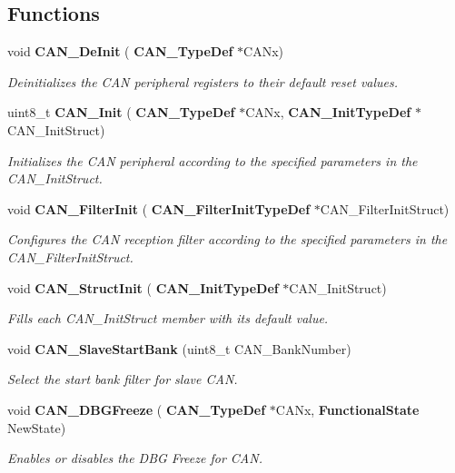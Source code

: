 \subsection*{Functions}
\begin{DoxyCompactItemize}
\item 
void \textbf{ C\+A\+N\+\_\+\+De\+Init} (\textbf{ C\+A\+N\+\_\+\+Type\+Def} $\ast$C\+A\+Nx)
\begin{DoxyCompactList}\small\item\em Deinitializes the C\+AN peripheral registers to their default reset values. \end{DoxyCompactList}\item 
uint8\+\_\+t \textbf{ C\+A\+N\+\_\+\+Init} (\textbf{ C\+A\+N\+\_\+\+Type\+Def} $\ast$C\+A\+Nx, \textbf{ C\+A\+N\+\_\+\+Init\+Type\+Def} $\ast$C\+A\+N\+\_\+\+Init\+Struct)
\begin{DoxyCompactList}\small\item\em Initializes the C\+AN peripheral according to the specified parameters in the C\+A\+N\+\_\+\+Init\+Struct. \end{DoxyCompactList}\item 
void \textbf{ C\+A\+N\+\_\+\+Filter\+Init} (\textbf{ C\+A\+N\+\_\+\+Filter\+Init\+Type\+Def} $\ast$C\+A\+N\+\_\+\+Filter\+Init\+Struct)
\begin{DoxyCompactList}\small\item\em Configures the C\+AN reception filter according to the specified parameters in the C\+A\+N\+\_\+\+Filter\+Init\+Struct. \end{DoxyCompactList}\item 
void \textbf{ C\+A\+N\+\_\+\+Struct\+Init} (\textbf{ C\+A\+N\+\_\+\+Init\+Type\+Def} $\ast$C\+A\+N\+\_\+\+Init\+Struct)
\begin{DoxyCompactList}\small\item\em Fills each C\+A\+N\+\_\+\+Init\+Struct member with its default value. \end{DoxyCompactList}\item 
void \textbf{ C\+A\+N\+\_\+\+Slave\+Start\+Bank} (uint8\+\_\+t C\+A\+N\+\_\+\+Bank\+Number)
\begin{DoxyCompactList}\small\item\em Select the start bank filter for slave C\+AN. \end{DoxyCompactList}\item 
void \textbf{ C\+A\+N\+\_\+\+D\+B\+G\+Freeze} (\textbf{ C\+A\+N\+\_\+\+Type\+Def} $\ast$C\+A\+Nx, \textbf{ Functional\+State} New\+State)
\begin{DoxyCompactList}\small\item\em Enables or disables the D\+BG Freeze for C\+AN. \end{DoxyCompactList}\item 

\end{DoxyCompactItemize}
